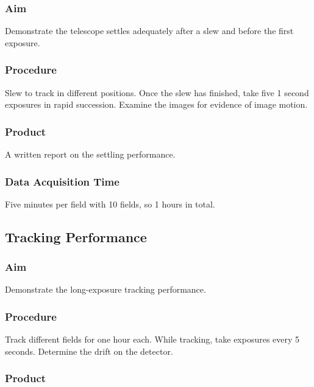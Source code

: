 \documentclass{article}
\begin{document}
\subsubsection{Aim}

Demonstrate the telescope settles adequately after a slew and before the first exposure.

\subsubsection{Procedure}

Slew to track in different positions. Once the slew has finished, take five 1 second exposures in rapid succession. Examine the images for evidence of image motion.

\subsubsection{Product}

A written report on the settling performance.

\subsubsection{Data Acquisition Time}

Five minutes per field with 10 fields, so 1 hours in total.


\subsection{Tracking Performance}

\subsubsection{Aim}

Demonstrate the long-exposure tracking performance.

\subsubsection{Procedure}

Track different fields for one hour each. While tracking, take exposures every 5 seconds. Determine the drift on the detector.

\subsubsection{Product}
\end{document}
